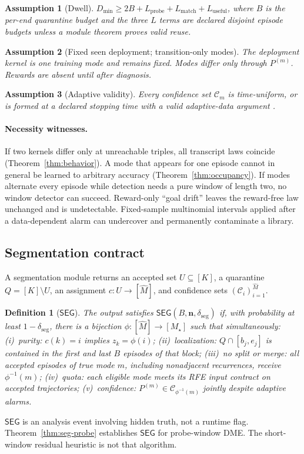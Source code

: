 \documentclass[11pt]{article}
\newtheorem{definition}{Definition}
\newtheorem{assumption}{Assumption}
\newcommand{\SEG}{\mathsf{SEG}}
\newcommand{\DME}{\textsc{DME}}
\newcommand{\cC}{\mathcal{C}}
\newcommand{\deltaseg}{\delta_{\mathrm{seg}}}
\begin{document}
\begin{assumption}[Dwell]
\label{ass:dwell}
$D_{\min}\ge 2B+L_{\mathrm{probe}}+L_{\mathrm{match}}+L_{\mathrm{useful}}$,
where $B$ is the per-end quarantine budget and the three $L$ terms are
declared disjoint episode budgets unless a module theorem proves valid reuse.
\end{assumption}

\begin{assumption}[Fixed seen deployment; transition-only modes]
\label{ass:deploy}
The deployment kernel is one training mode and remains fixed. Modes differ
only through $P^{(m)}$. Rewards are absent until after diagnosis.
\end{assumption}

\begin{assumption}[Adaptive validity]
\label{ass:adapt}
Every confidence set $\cC_m$ is time-uniform, or is formed at a declared
stopping time with a valid adaptive-data argument
\citep{howard2021timeuniform}.
\end{assumption}

\paragraph{Necessity witnesses.}
If two kernels differ only at unreachable triples, all transcript laws
coincide (Theorem~\ref{thm:behavior}). A mode that appears for one episode
cannot in general be learned to arbitrary accuracy
(Theorem~\ref{thm:occupancy}). If modes alternate every episode while
detection needs a pure window of length two, no window detector can succeed.
Reward-only ``goal drift'' leaves the reward-free law unchanged and is
undetectable. Fixed-sample multinomial intervals applied after a
data-dependent alarm can undercover and permanently contaminate a library.

\subsection{Segmentation contract}
A segmentation module returns an accepted set $U\subseteq[K]$, a quarantine
$Q=[K]\setminus U$, an assignment $c:U\to[\widehat M]$, and confidence sets
$(\cC_i)_{i=1}^{\widehat M}$.

\begin{definition}[$\SEG$]
\label{def:seg}
The output satisfies $\SEG(B,\mathbf{n},\deltaseg)$ if, with probability at
least $1-\deltaseg$, there is a bijection $\phi:[\widehat M]\to[M_\star]$ such
that simultaneously: (i)~\emph{purity:} $c(k)=i$ implies $z_k=\phi(i)$;
(ii)~\emph{localization:} $Q\cap[b_j,e_j]$ is contained in the first and last
$B$ episodes of that block; (iii)~\emph{no split or merge:} all accepted
episodes of true mode $m$, including nonadjacent recurrences, receive
$\phi^{-1}(m)$; (iv)~\emph{quota:} each eligible mode meets its RFE input
contract on accepted trajectories; (v)~\emph{confidence:}
$P^{(m)}\in\cC_{\phi^{-1}(m)}$ jointly despite adaptive alarms.
\end{definition}
$\SEG$ is an analysis event involving hidden truth, not a runtime flag.
Theorem~\ref{thm:seg-probe} establishes $\SEG$ for probe-window \DME.
The short-window residual heuristic is not that algorithm.
\end{document}
